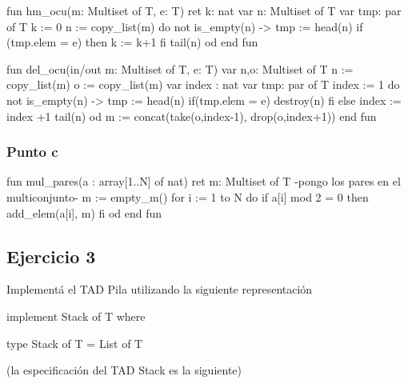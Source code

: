 \begin{codebox}
\begin{pascallike}
fun hm_ocu(m: Multiset of T, e: T) ret k: nat
    var n: Multiset of T
    var tmp: par of T
    k := 0
    n := copy_list(m)
    do not is_empty(n) ->
        tmp := head(n)
        if (tmp.elem = e) then
            k := k+1
        fi
        tail(n)
    od
end fun

fun del_ocu(in/out m: Multiset of T, e: T)
    var n,o: Multiset of T
    n := copy_list(m)
    o := copy_list(m)
    var index : nat
    var tmp: par of T
    index := 1
    do not is_empty(n) ->
        tmp := head(n)
        if(tmp.elem = e) 
            destroy(n)
        fi
        else index := index +1
        tail(n)
    od
    m := concat(take(o,index-1), drop(o,index+1))
end fun
\end{pascallike}
\end{codebox}

\subsubsection{Punto c}
\begin{codebox}
\begin{pascallike}
fun mul_pares(a : array[1..N] of nat) ret m: Multiset of T
    {-pongo los pares en el multiconjunto-}
    m := empty_m()
    for i := 1 to N do
        if a[i] mod 2 = 0 then
            add_elem(a[i], m)
        fi
    od
end fun
\end{pascallike}
\end{codebox}

\newpage
\subsection{Ejercicio 3}
Implementá el TAD Pila utilizando la siguiente representación
\begin{codebox}
\begin{pascallike}
implement Stack of T where

type Stack of T = List of T
\end{pascallike}
\end{codebox}
(la especificación del TAD Stack es la siguiente)

